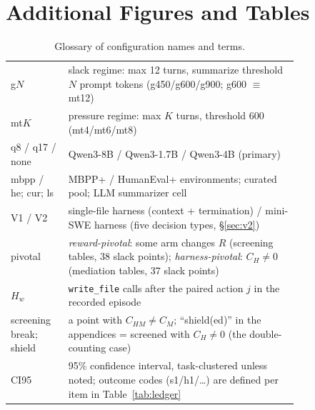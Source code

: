 \documentclass{article}
\theoremstyle{remark}
\begin{document}
\section{Additional Figures and Tables}
\label{app:figs}
\begin{table}[h]
\centering\scriptsize
\begin{tabular}{@{}lp{0.80\linewidth}@{}}
\toprule
g$N$ & slack regime: max 12 turns, summarize threshold $N$ prompt tokens (g450/g600/g900; g600 $\equiv$ mt12) \\
mt$K$ & pressure regime: max $K$ turns, threshold 600 (mt4/mt6/mt8) \\
q8 / q17 / none & Qwen3-8B / Qwen3-1.7B / Qwen3-4B (primary) \\
mbpp / he; cur; ls & MBPP+ / HumanEval+ environments; curated pool; LLM summarizer cell \\
V1 / V2 & single-file harness (context + termination) / mini-SWE harness (five decision types, \S\ref{sec:v2}) \\
pivotal & \emph{reward-pivotal}: some arm changes $R$ (screening tables, 38 slack points); \emph{harness-pivotal}: $C_H \neq 0$ (mediation tables, 37 slack points) \\
$H_w$ & \texttt{write\_file} calls after the paired action $j$ in the recorded episode \\
screening break; shield & a point with $C_{HM} \neq C_M$; ``shield(ed)'' in the appendices = screened with $C_H \neq 0$ (the double-counting case) \\
CI95 & 95\% confidence interval, task-clustered unless noted; outcome codes (s1/h1/\ldots) are defined per item in Table~\ref{tab:ledger} \\
\bottomrule
\end{tabular}
\caption{Glossary of configuration names and terms.}
\label{tab:glossary}
\end{table}
\end{document}
